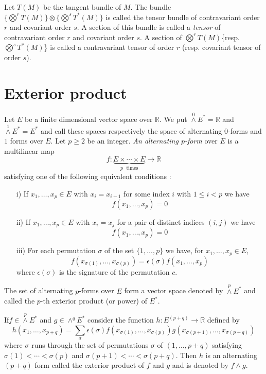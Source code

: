 Let $T(M)$ be the tangent bundle of $M$. The bundle $\{\bigotimes\limits^{r}T(M)\}\otimes \{\bigotimes\limits^{s}T^{*}(M)\}$ is called the tensor bundle of contravariant order $r$ and covariant order $s$. A section of this bundle is called a {\em tensor} of contravariant order $r$ and covariant order $s$. A section of $\bigotimes\limits^{r}T(M)$\pageoriginale \{resp. $\bigotimes\limits^{s}T^{*}(M)$\} is called a contravariant tensor of order $r$ (resp. covariant tensor of order $s$).

\section*{Exterior product}

Let $E$ be a finite dimensional vector space over $\mathbb{R}$. We put ${\displaystyle{\mathop{\wedge}\limits^{0}}}E^{*}=\mathbb{R}$ and ${\displaystyle{\mathop{\wedge}\limits^{1}}}E^{*}=E^{*}$ and call these spaces respectively the space of alternating $0$-forms and $1$ forms over $E$. Let $p\geq 2$ be an integer. {\em An alternating $p$-form} over $E$ is a multilinear map
$$
f:\underbrace{E\times \cdots \times E}_{p\text{~ times}}\to \mathbb{R}
$$
satisfying one of the following equivalent conditions :
\begin{itemize}
\item[i)] If $x_{1},\ldots,x_{p}\in E$ with $x_{i}=x_{i+1}$ for some index $i$ with $1\leq i<p$ we have
$$
f(x_{1},\ldots,x_{p})=0
$$

\item[ii)] If $x_{1},\ldots,x_{p}\in E$ with $x_{i}=x_{j}$ for a pair of distinct indices $(i,j)$ we have
$$
f(x_{1},\ldots,x_{p})=0
$$

\item[iii)] For each permutation $\sigma$ of the set $\{1,\ldots,p\}$ we have, for $x_{1},\ldots,x_{p}\in E$,
$$
f(x_{\sigma(1)},\ldots,x_{\sigma(p)})=\epsilon(\sigma)f(x_{1},\ldots,x_{p})
$$
where $\epsilon(\sigma)$ is the signature of the permutation $c$.
\end{itemize}

The set of alternating $p$-forms over $E$ form a vector space denoted by ${\displaystyle{\mathop{\wedge}\limits^{p}}}E^{*}$ and called the $p$-th exterior product (or power) of $E^{*}$.

If\pageoriginale $f\in {\displaystyle{\mathop{\wedge}\limits^{p}}} E^{*}$ and $g\in {\displaystyle{\mathop{\wedge}^{q}}}E^{*}$ consider the function $h:E^{(p+q)}\to \mathbb{R}$ defined by
$$
h(x_{1},\ldots,x_{p+q})=\sum\limits_{\sigma}\epsilon(\sigma)f(x_{\sigma(1)},\ldots,x_{\sigma(p)})g(x_{\sigma(p+1)},\ldots,x_{\sigma(p+q)})
$$
where $\sigma$ runs through the set of permutations $\sigma$ of $(1,\ldots,p+q)$ satisfying $\sigma(1)<\cdots<\sigma(p)$ and $\sigma(p+1)<\cdots<\sigma(p+q)$. Then $h$ is an alternating $(p+q)$ form called the exterior product of $f$ and $g$ and is denoted by $f\wedge g$.

